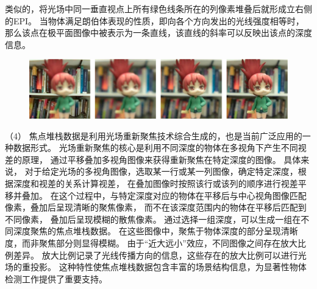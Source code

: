类似的，将光场中同一垂直视点上所有绿色线条所在的列像素堆叠后就形成立右侧的EPI。
当物体满足朗伯体表现的性质，即向各个方向发出的光线强度相等时，那么该点在极平面图像中被表示为一条直线，该直线的斜率可以反映出该点的深度信息。\par
%
%
%
%
\begin{figure}[!ht]
	\centering
	\includegraphics[width=0.95\linewidth]{figures/chapter2/focal_stack}
	\label{cpt2_fig7:focal_stack}
\end{figure}
%
%
%
%
（4）
焦点堆栈数据是利用光场重新聚焦技术综合生成的，也是当前广泛应用的一种数据形式。
光场重新聚焦的核心是利用不同深度的物体在多视角下产生不同视差的原理，
通过平移叠加多视角图像来获得重新聚焦在特定深度的图像。
%
%
%
%
%
具体来说，
对于给定光场的多视角图像，选取某一行或某一列图像，确定特定深度，根据深度和视差的关系计算视差，
在叠加图像时按照该行或该列的顺序进行视差平移并叠加。
在这个过程中，与特定深度对应的物体在平移后与中心视角图像匹配像素，叠加后呈现清晰的聚焦像素，
而不在该深度范围内的物体在平移后匹配到不同像素，
叠加后呈现模糊的散焦像素。
通过选择一组深度，可以生成一组在不同深度聚焦的焦点堆栈数据。
%
%
%
在这些图像中，聚焦于物体深度的部分呈现清晰度，而非聚焦部分则显得模糊。
由于“近大远小”效应，不同图像之间存在放大比例差异。
放大比例记录了光线传播方向的信息，这些存在的放大比例可以进行光场的重投影。
这种特性使焦点堆栈数据包含丰富的场景结构信息，为显著性物体检测工作提供了重要支持。
\par
%
%
%
%
%
%
%
